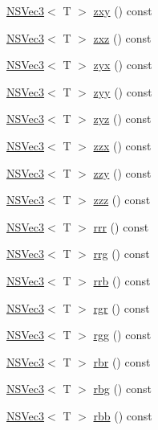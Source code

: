 \begin{DoxyCompactItemize}
\item 
\hyperlink{structNSVec3}{N\-S\-Vec3}$<$ T $>$ \hyperlink{structNSVec3_a019d00f31e59cc959279c00956613d5d}{zxy} () const 
\item 
\hyperlink{structNSVec3}{N\-S\-Vec3}$<$ T $>$ \hyperlink{structNSVec3_a8e4472d55a89d659fcb8d39500cc8c8a}{zxz} () const 
\item 
\hyperlink{structNSVec3}{N\-S\-Vec3}$<$ T $>$ \hyperlink{structNSVec3_addaa05acc5906dac5029c55c6ba2113b}{zyx} () const 
\item 
\hyperlink{structNSVec3}{N\-S\-Vec3}$<$ T $>$ \hyperlink{structNSVec3_a7499ad1201489ceedb540f2eb1b10fb0}{zyy} () const 
\item 
\hyperlink{structNSVec3}{N\-S\-Vec3}$<$ T $>$ \hyperlink{structNSVec3_a69345d0593bed6157946deb660ece026}{zyz} () const 
\item 
\hyperlink{structNSVec3}{N\-S\-Vec3}$<$ T $>$ \hyperlink{structNSVec3_ae769202a58f5066d50fb96fd106a048a}{zzx} () const 
\item 
\hyperlink{structNSVec3}{N\-S\-Vec3}$<$ T $>$ \hyperlink{structNSVec3_af0fc423f7ddaa69a5327737fa5852800}{zzy} () const 
\item 
\hyperlink{structNSVec3}{N\-S\-Vec3}$<$ T $>$ \hyperlink{structNSVec3_a27acce84e85fb42b15d7ddb19372636c}{zzz} () const 
\item 
\hyperlink{structNSVec3}{N\-S\-Vec3}$<$ T $>$ \hyperlink{structNSVec3_a1f451a25ae47030a546446a83306be00}{rrr} () const 
\item 
\hyperlink{structNSVec3}{N\-S\-Vec3}$<$ T $>$ \hyperlink{structNSVec3_aeb93c43c46493433bb97acb0c3482b44}{rrg} () const 
\item 
\hyperlink{structNSVec3}{N\-S\-Vec3}$<$ T $>$ \hyperlink{structNSVec3_aefce99196d8cd62301c029573223b8aa}{rrb} () const 
\item 
\hyperlink{structNSVec3}{N\-S\-Vec3}$<$ T $>$ \hyperlink{structNSVec3_a092c2fa5af08275a6a799d7b088aec5d}{rgr} () const 
\item 
\hyperlink{structNSVec3}{N\-S\-Vec3}$<$ T $>$ \hyperlink{structNSVec3_a7c316ea0542653590bb9f6c42faa2067}{rgg} () const 
\item 
\hyperlink{structNSVec3}{N\-S\-Vec3}$<$ T $>$ \hyperlink{structNSVec3_aa977e64934960e51b76a0411c6bf7e9e}{rbr} () const 
\item 
\hyperlink{structNSVec3}{N\-S\-Vec3}$<$ T $>$ \hyperlink{structNSVec3_a0abcf1fa3d21c33218c0fe5d4cc6597b}{rbg} () const 
\item 
\hyperlink{structNSVec3}{N\-S\-Vec3}$<$ T $>$ \hyperlink{structNSVec3_a35e03b1d298a90b658fe165bed589bf2}{rbb} () const 

\end{DoxyCompactItemize}

